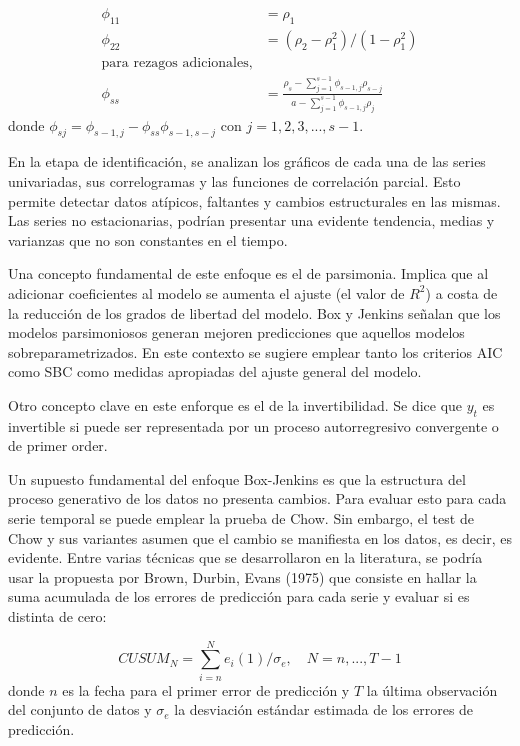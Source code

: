 \begin{align}
\label{eq: 2_35}
\phi_{11}&=\rho_1\\
\label{eq: 2_36}
\phi_{22}&=(\rho_2-\rho_1^2)/(1-\rho_1^2)\\
\nonumber
\text{para rezagos adicionales,}\\
\label{eq: 2_37}
\phi_{ss}&=\frac{\rho_s-\sum_{j=1}^{s-1}\phi_{s-1,j}\rho_{s-j}}{a-\sum_{j=1}^{s-1}\phi_{s-1,j}\rho_j}
\end{align}
donde $\phi_{sj}=\phi_{s-1,j}-\phi_{ss}\phi_{s-1,s-j}$ con $j=1,2,3,...,s-1$.

En la etapa de identificación, se analizan los gráficos de cada una de las series univariadas, sus correlogramas y las funciones de correlación parcial. Esto permite detectar datos atípicos, faltantes y cambios estructurales en las mismas. Las series no estacionarias, podrían presentar una evidente tendencia, medias y varianzas que no son constantes en el tiempo.

Una concepto fundamental de este enfoque es el de parsimonia. Implica que al adicionar coeficientes al modelo se aumenta el ajuste (el valor de $R^2$) a costa de la reducción de los grados de libertad del modelo. Box y Jenkins señalan que los modelos parsimoniosos generan mejoren predicciones que aquellos modelos sobreparametrizados. En este contexto se sugiere emplear tanto los criterios AIC como SBC como medidas apropiadas del ajuste general del modelo.

Otro concepto clave en este enforque es el de la invertibilidad. Se dice que $y_t$ es invertible si puede ser representada por un proceso autorregresivo convergente o de primer order.

Un supuesto fundamental del enfoque Box-Jenkins es que la estructura del proceso generativo de los datos no presenta cambios. Para evaluar esto para cada serie temporal se puede emplear la prueba de Chow. Sin embargo, el test de Chow y sus variantes asumen que el cambio se manifiesta en los datos, es decir, es evidente. Entre varias técnicas que se desarrollaron en la literatura, se podría usar la propuesta por Brown, Durbin, Evans (1975) que consiste en hallar la suma acumulada de los errores de predicción para cada serie y evaluar si es distinta de cero:

\begin{equation*}
CUSUM_N=\sum_{i=n}^{N}e_i(1)/\sigma_e,\quad N=n,...,T-1    
\end{equation*}
donde $n$ es la fecha para el primer error de predicción y $T$ la última observación del conjunto de datos y $\sigma_e$ la desviación estándar estimada de los errores de predicción.



